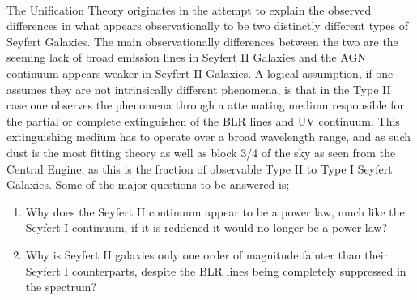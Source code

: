 \documentclass[11pt]{article}
\begin{document}
\\
The Unification Theory originates in the attempt to explain the observed differences in what appears observationally to be two distinctly different types of Seyfert Galaxies. The main observationally differences between the two are the seeming lack of broad emission lines in Seyfert II Galaxies and the AGN continuum appears weaker in Seyfert II Galaxies. A logical assumption, if one assumes they are not intrinsically different phenomena, is that in the Type II case one observes the phenomena through a attenuating medium responsible for the partial or complete extinguishen of the BLR lines and UV continuum. This extinguishing medium has to operate over a broad wavelength range, and as such dust is the most fitting theory as well as block 3/4 of the sky as seen from the Central Engine, as this is the fraction of observable Type II to Type I Seyfert Galaxies. Some of the major questions to be answered is;
\begin{enumerate}
\item Why does the Seyfert II continuum appear to be a power law, much like the Seyfert I continuum, if it is reddened it would no longer be a power law?
\item Why is Seyfert II galaxies only one order of magnitude fainter than their Seyfert I counterparts, despite the BLR lines being completely suppressed in the spectrum?
\end{enumerate}
\end{document}
